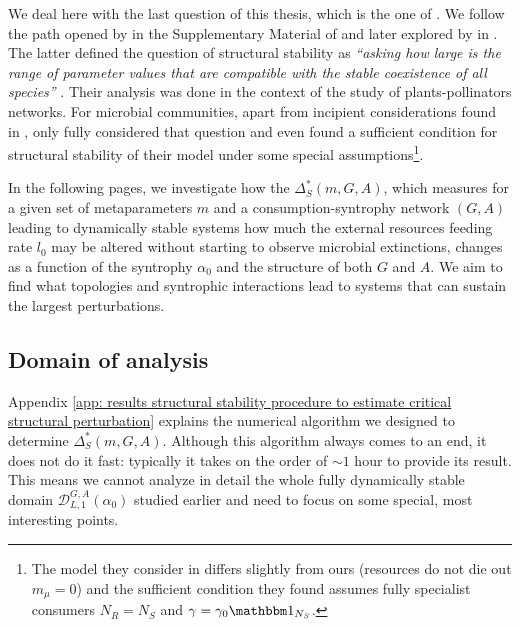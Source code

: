 \documentclass[12pt, titlepage]{report}
\begin{document}
We deal here with the last question of this thesis, which is the one of . We follow the path opened by \citeauthor{bastolla_architecture_2009} in the Supplementary Material of \cite{bastolla_architecture_2009} and later explored by  \citeauthor{rohr_structural_2014} in \cite{rohr_structural_2014}. The latter defined the question of structural stability as \textit{``asking how large is the range of parameter values that are compatible with the stable coexistence of all species''} \cite{rohr_structural_2014}. Their analysis was done in the context of the study of plants-pollinators networks.
For microbial communities, apart from incipient considerations found in  \cite{tikhonov_collective_2017,marsland_available_2019}, only \citeauthor{butler_stability_2018} fully considered that question \cite{butler_stability_2018} and even found a sufficient condition for structural stability of their model under some special assumptions\footnote{The model they consider in \cite{butler_stability_2018} differs slightly from ours (\eg resources do not die out $m_\mu=0$) and the sufficient condition they found assumes fully specialist consumers \ie $N_R=N_S$ and $\gamma=\gamma_0 \identity{N_S}$.}.

In the following pages, we investigate how the  $\Delta_S^*(m, G, A)$, which measures for a given set of metaparameters $m$ and a consumption-syntrophy network $(G,A)$ leading to dynamically stable systems how much the external resources feeding rate $l_0$ may be altered without starting to observe microbial extinctions, changes as a function of the syntrophy $\alpha_0$ and the structure of both $G$ and $A$. We aim to find what topologies and syntrophic interactions lead to systems that can sustain the largest perturbations.
\subsection{Domain of analysis}
Appendix \ref{app: results structural stability procedure to estimate critical structural perturbation} explains the numerical algorithm we designed to determine $\Delta_S^*(m, G, A)$. Although this algorithm always comes to an end, it does not do it fast: typically it takes on the order of $\sim 1$ hour to provide its result. This means we cannot analyze in detail the whole fully dynamically stable domain $\mathcal{D}_{L,1}^{G,A}(\alpha_0)$ studied earlier and need to focus on some special, most interesting points.
\end{document}
